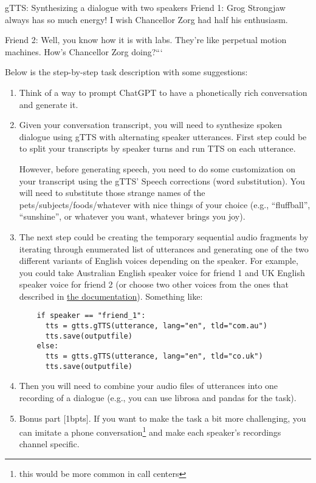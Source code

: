 \documentclass{../labbook}
\begin{document}
\begin{problem}{1}{10}{gTTS: Synthesizing a dialogue with two speakers}
Friend 1: Grog Strongjaw always has so much energy! I wish Chancellor Zorg had half his enthusiasm.

Friend 2: Well, you know how it is with labs. They're like perpetual motion machines. How's Chancellor Zorg doing?```


Below is the step-by-step task description with some suggestions:
\begin{enumerate}
      \item Think of a way to prompt ChatGPT to have a phonetically rich conversation and generate it.
      
      \item Given your conversation transcript, you will need to synthesize spoken dialogue using gTTS with alternating speaker utterances. First step could be to split your transcripts by speaker turns and run TTS on each utterance.
    
    However, before generating speech, you need to do some customization on your transcript using the gTTS' Speech corrections (word substitution). You will need to substitute those strange names of the pets/subjects/foods/whatever with nice things of your choice (e.g., ``fluffball'', ``sunshine'', or whatever you want, whatever brings you joy).

    \item The next step could be creating the temporary sequential audio fragments by iterating through enumerated list of utterances and generating one of the two different variants of English voices depending on the speaker. 
    For example, you could take Australian English speaker voice for friend 1 and UK English speaker voice for friend 2 (or choose two other voices from the ones that described in \href{https://gtts.readthedocs.io/en/latest/module.html}{the documentation}). Something like:
    \begin{verbatim}
    if speaker == "friend_1":
      tts = gtts.gTTS(utterance, lang="en", tld="com.au")
      tts.save(outputfile)
    else:
      tts = gtts.gTTS(utterance, lang="en", tld="co.uk")
      tts.save(outputfile)
    \end{verbatim}

    \item Then you will need to combine your audio files of utterances into one recording of a dialogue (e.g., you can use librosa and pandas for the task). 
    
    \item Bonus part [1bpts]. If you want to make the task a bit more challenging, you can imitate a phone conversation\footnote{this would be more common in call centers} and make each speaker's recordings channel specific.
    

\end{enumerate}
\end{problem}
\end{document}

